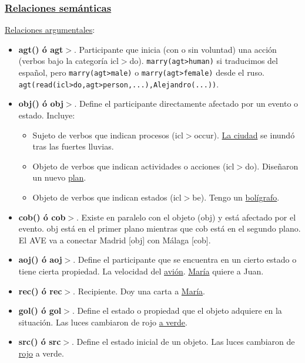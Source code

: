 \documentclass{article}
\begin{document}
\begin{multicols*}{3}
\subsubsection*{\underline{Relaciones semánticas}}

\underline{Relaciones argumentales}:

\begin{itemize}[itemsep=0pt, parsep=0pt, leftmargin=1em]
    \item \textbf{agt() ó agt$>$}. Participante que inicia (con o sin voluntad)
    una acción (verbos bajo la categoría icl$>$do). \verb+marry(agt>human)+ si traducimos del español, pero \verb+marry(agt>male)+ o \verb+marry(agt>female)+ desde el ruso. \verb+agt(read(icl>do,agt>person,...),Alejandro(...))+.
    \item \textbf{obj() ó obj$>$}. Define el participante directamente afectado por un evento o estado. Incluye:
    \begin{itemize}[itemsep=0pt, parsep=0pt, leftmargin=1em]
        \item Sujeto de verbos que indican procesos (icl$>$occur). \underline{La ciudad} se inundó tras las fuertes lluvias.
        \item Objeto de verbos que indican actividades o acciones (icl$>$do). Diseñaron un nuevo \underline{plan}.
        \item Objeto de verbos que indican estados (icl$>$be). Tengo un \underline{bolígrafo}.
    \end{itemize}
    \item \textbf{cob() ó cob$>$}. Existe en paralelo con el objeto (obj) y está afectado por el evento. obj está en el primer plano mientras que cob está en el segundo plano. El AVE va a conectar Madrid [obj] con Málaga [cob].
    \item \textbf{aoj() ó aoj$>$}. Define el participante que se encuentra en un cierto estado o tiene cierta propiedad. La velocidad del \underline{avión}. \underline{María} quiere a Juan.
    \item \textbf{rec() ó rec$>$}. Recipiente. Doy una carta a \underline{María}.
    \item \textbf{gol() ó gol$>$}. Define el estado o propiedad que el objeto adquiere en la situación. Las luces cambiaron de rojo \underline{a verde}.
    \item \textbf{src() ó src$>$}. Define el estado inicial de un objeto. Las luces cambiaron de \underline{rojo} a verde.
\end{itemize}


\end{multicols*}
\end{document}
